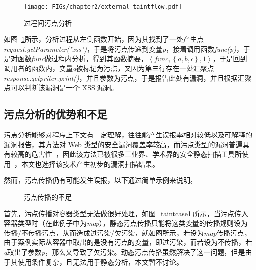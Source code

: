 \begin{figure}[!htbp]
	\centering
	\texttt{[image: FIGs/chapter2/external\_taintflow.pdf]}
	\caption{过程间污点分析}\label{externalflow}
\end{figure}

如图~\ref{externalflow}所示，分析过程从左侧函数开始，因为其找到了一处产生点——\textit{request.getParameter("xss")}，于是将污点传递到变量\textit{p}，接着调用函数\textit{func(p)}，于是对函数\textit{func}做过程内分析，得到其函数摘要，$\left\langle func, \left\{a, b, c\right\}, 1\right\rangle$，于是回到调用者的函数内，变量\textit{q}被标记为污点，又因为第三行存在一处汇聚点——\textit{response.getpriter.print()}，并且参数为污点，于是报告此处有漏洞，并且根据汇聚点可以判断该漏洞是一个 XSS 漏洞。

\subsection{污点分析的优势和不足}
污点分析能够对程序上下文有一定理解，往往能产生误报率相对较低以及可解释的漏洞报告，其方法对 Web 类型的安全漏洞覆盖率较高，而污点类型的漏洞普遍具有较高的危害性~\cite{taintStyle,aletheia}，因此该方法已被很多工业界、学术界的安全静态扫描工具所使用~\cite{taintStyle,taint:taj,pixy}，本文也选择该技术产生初步的漏洞扫描结果。

然而，污点传播仍有可能发生误报，以下通过简单示例来说明。

\begin{figure}[!htbp]
	\centering
	\caption{污点传播的不足}
	\label{fig:rq3} %
\end{figure}

首先，污点传播对容器类型无法做很好处理，如图~\ref{taintcase1}所示，当污点传入容器类型时（在此例子中为\textit{map}），静态污点传播只能将这类变量的传播规则设为传播/不传播污点，从而造成过污染/欠污染，就如图所示，若设为\textit{map}传播污点，由于案例实际从容器中取出的是没有污点的变量，即过污染，而若设为不传播，若\textit{q}取出了参数\textit{p}，那么又导致了欠污染。动态污点传播虽然解决了这一问题，但是由于其使用条件复杂，且无法用于静态分析，本文暂不讨论。

